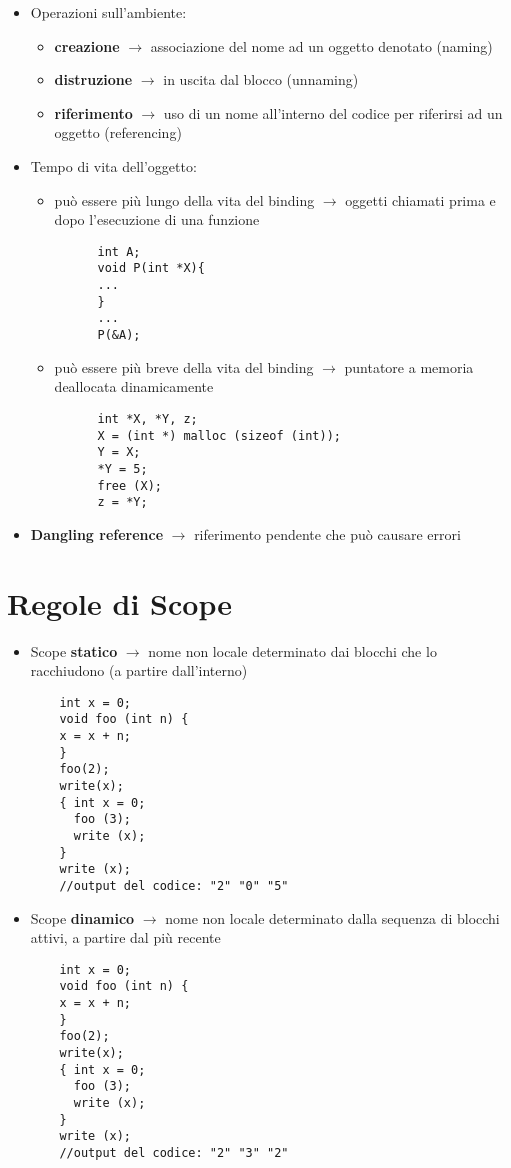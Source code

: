 \documentclass[12pt]{extarticle}
\begin{document}
\begin{itemize}
  \newpage

  \item Operazioni sull'ambiente:
  \begin{itemize}
    \item \textbf{creazione} $\rightarrow$ associazione del nome ad un oggetto denotato (naming)
    \item \textbf{distruzione} $\rightarrow$ in uscita dal blocco (unnaming)
    \item \textbf{riferimento} $\rightarrow$ uso di un nome all'interno del codice per riferirsi ad un oggetto (referencing)
  \end{itemize}
  \item Tempo di vita dell'oggetto:
  \begin{itemize}
    \item può essere più lungo della vita del binding $\rightarrow$ oggetti chiamati prima e dopo l'esecuzione di una funzione
    \begin{lstlisting}
      int A;
      void P(int *X){
      ...
      }
      ...
      P(&A);
    \end{lstlisting}
    \item può essere più breve della vita del binding $\rightarrow$ puntatore a memoria deallocata dinamicamente
    \begin{lstlisting}
      int *X, *Y, z;
      X = (int *) malloc (sizeof (int));
      Y = X;
      *Y = 5;
      free (X);
      z = *Y;       
    \end{lstlisting}
  \end{itemize} 
  \item \textbf{Dangling reference} $\rightarrow$ riferimento pendente che può causare errori
\end{itemize}

\section*{Regole di Scope}
\begin{itemize}
  \item Scope \textbf{statico} $\rightarrow$ nome non locale determinato dai blocchi che lo racchiudono (a partire dall'interno)
  \begin{lstlisting}
    int x = 0;
    void foo (int n) {
    x = x + n;
    }
    foo(2);
    write(x);
    { int x = 0;
      foo (3);
      write (x);
    }
    write (x);
    //output del codice: "2" "0" "5"

  \end{lstlisting}
  \item Scope \textbf{dinamico} $\rightarrow$ nome non locale determinato dalla sequenza di blocchi attivi, a partire dal più recente
  \begin{lstlisting}
    int x = 0;
    void foo (int n) {
    x = x + n;
    }
    foo(2);
    write(x);
    { int x = 0;
      foo (3);
      write (x);
    }
    write (x);
    //output del codice: "2" "3" "2"
  \end{lstlisting}

  \newpage

\end{itemize}
\end{document}
